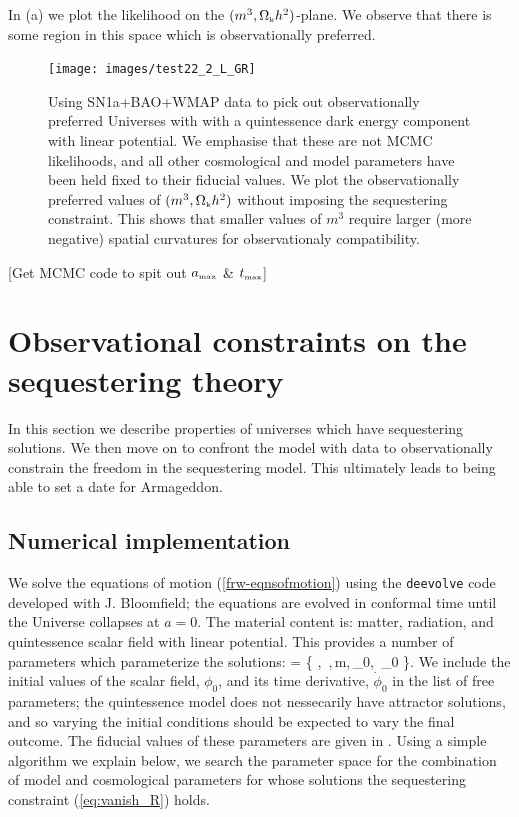 \documentclass[amsmath,amssymb,10pt,twocolumn,eqsecnum]{revtex4}
\newcommand{\comment}[1]{{\color{red}[#1]}}
\begin{document}
In (a) we plot the likelihood on the $(m^3, {\Omega}_{\scriptscriptstyle{\textrm{k}}}h^2)$-plane. We observe that there is some region in this space which is observationally preferred. 

\begin{figure}[!t]
      \begin{center}
{\texttt{[image: images/test22\_2\_L\_GR]}}
      \end{center}
\caption{Using  SN1a+BAO+WMAP data   to pick out observationally preferred        Universes with with a quintessence dark energy component with linear potential. We emphasise that these are not MCMC likelihoods, and all other cosmological and model parameters have been held fixed to their fiducial values. We plot the observationally preferred values of $(m^3, {\Omega}_{\scriptscriptstyle{\textrm{k}}}h^2)$ without imposing the sequestering constraint. This shows that smaller values of $m^3$ require larger (more negative) spatial curvatures for observationaly compatibility.   }\label{fig:plots-like}
\end{figure}

\comment{Get MCMC code to spit out ${a}_{\scriptscriptstyle{\textrm{max}}}$ \& ${t}_{\scriptscriptstyle{\textrm{max}}}$}

\section{Observational constraints on the sequestering theory} 
In this section we describe properties of universes which have sequestering solutions. We then move on to confront the model with   data to observationally constrain the freedom in the sequestering model. This ultimately leads to being able to set a date for Armageddon.

\subsection{Numerical implementation}

We solve the equations of motion (\ref{frw-eqnsofmotion}) using the  {\tt deevolve} code developed with J. Bloomfield; the equations are evolved in conformal time until the Universe collapses at $a=0$.  The material content is: matter, radiation, and quintessence scalar field with linear potential. This provides a number of parameters which  parameterize the solutions: 
\bea
{} = \left\{ , \,,\,m,\,\phi_0, \,\dot{\phi}_0 \right\}.
\eea
We include the initial values of the scalar field, $\phi_0$, and its time derivative, $\dot{\phi}_0$ in the list of free parameters; the quintessence model does not nessecarily have attractor solutions, and so varying the initial conditions should be expected to vary the final outcome. The fiducial values of these parameters are given in . Using a simple algorithm we explain below, we search the parameter space for the combination of model and cosmological parameters for whose solutions the sequestering constraint (\ref{eq:vanish_R}) holds. 
\end{document}
